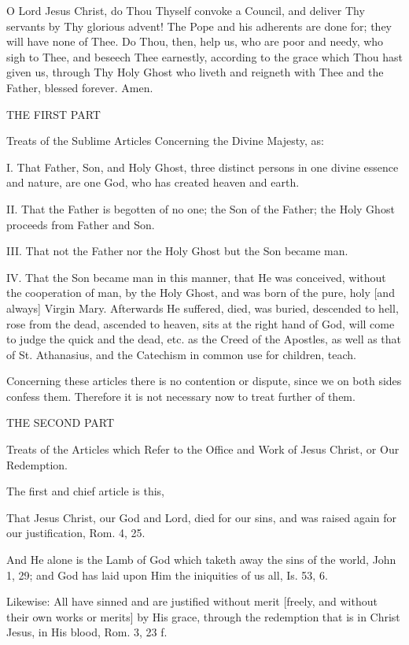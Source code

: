 O Lord Jesus Christ, do Thou Thyself convoke a Council, and
deliver Thy servants by Thy glorious advent! The Pope and his
adherents are done for; they will have none of Thee. Do Thou,
then, help us, who are poor and needy, who sigh to Thee, and
beseech Thee earnestly, according to the grace which Thou hast
given us, through Thy Holy Ghost who liveth and reigneth with
Thee and the Father, blessed forever. Amen.




THE FIRST PART

Treats of the Sublime Articles Concerning the Divine Majesty,
as:

I.
That Father, Son, and Holy Ghost, three distinct persons in
one divine essence and nature, are one God, who has created
heaven and earth.

II.
That the Father is begotten of no one; the Son of the Father;
the Holy Ghost proceeds from Father and Son.

III.
That not the Father nor the Holy Ghost but the Son became man.

IV.
That the Son became man in this manner, that He was conceived,
without the cooperation of man, by the Holy Ghost, and was
born of the pure, holy [and always] Virgin Mary. Afterwards He
suffered, died, was buried, descended to hell, rose from the
dead, ascended to heaven, sits at the right hand of God, will
come to judge the quick and the dead, etc. as the Creed of the
Apostles, as well as that of St. Athanasius, and the Catechism
in common use for children, teach.

Concerning these articles there is no contention or dispute,
since we on both sides confess them. Therefore it is not
necessary now to treat further of them.




THE SECOND PART

Treats of the Articles which Refer to
the Office and Work of Jesus Christ,
or Our Redemption.

The first and chief article is this,

That Jesus Christ, our God and Lord, died for our sins, and
was raised again for our justification, Rom. 4, 25.

And He alone is the Lamb of God which taketh away the sins of
the world, John 1, 29; and God has laid upon Him the
iniquities of us all, Is. 53, 6.

Likewise: All have sinned and are justified without merit
[freely, and without their own works or merits] by His grace,
through the redemption that is in Christ Jesus, in His blood,
Rom. 3, 23 f.

